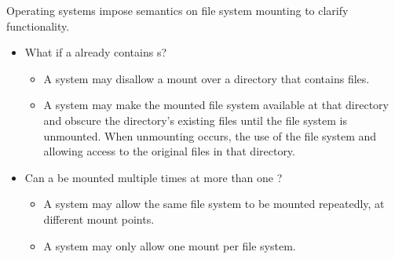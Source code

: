 Operating systems impose semantics on file system mounting to clarify functionality.
\begin{itemize}[noitemsep]
\item What if a  already contains s?
  \begin{itemize}[noitemsep]
  \item A system may disallow a mount over a directory that contains files.
  \item A system may make the mounted file system available at that directory and obscure the directory’s existing files until the file system is unmounted.
    When unmounting occurs, the use of the file system and allowing access to the original files in that directory.
  \end{itemize}
\item Can a  be mounted multiple times at more than one ?
  \begin{itemize}[noitemsep]
  \item A system may allow the same file system to be mounted repeatedly, at different mount points.
  \item A system may only allow one mount per file system.
  \end{itemize}
\end{itemize}

